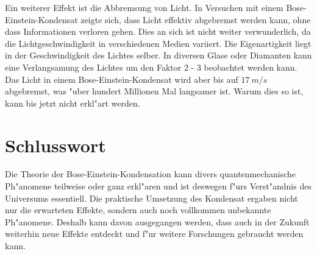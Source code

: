 \begin{refsection}
Ein weiterer Effekt ist die Abbremsung von Licht. In Versuchen mit einem Bose-Einstein-Kondensat zeigte sich, dass Licht effektiv abgebremst werden kann, ohne dass Informationen verloren gehen. Dies an sich ist nicht weiter verwunderlich, da die Lichtgeschwindigkeit in verschiedenen Medien variiert. Die Eigenartigkeit liegt in der Geschwindigkeit des Lichtes selber. In diversen Glase oder Diamanten kann eine Verlangsamung des Lichtes um den Faktor 2 - 3 beobachtet werden kann. Das Licht in einem Bose-Einstein-Kondensat wird aber bis auf $17~m/s$ abgebremst, was "uber hundert Millionen Mal langsamer ist. Warum dies so ist, kann bis jetzt nicht erkl"art werden. \cite{bose:SlowLight}

\section{Schlusswort}

Die Theorie der Bose-Einstein-Kondensation kann divers quantenmechanische Ph"anomene teilweise oder ganz erkl"aren und ist deswegen f"urs Verst"andnis des Universums essentiell. Die praktische Umsetzung des Kondensat ergaben nicht nur die erwarteten Effekte, sondern auch noch vollkommen unbekannte Ph"anomene. Deshalb kann davon ausgegangen werden, dass auch in der Zukunft weiterhin neue Effekte entdeckt und f"ur weitere Forschungen gebraucht werden kann. 

\printbibliography[heading=subbibliography]
\end{refsection}



